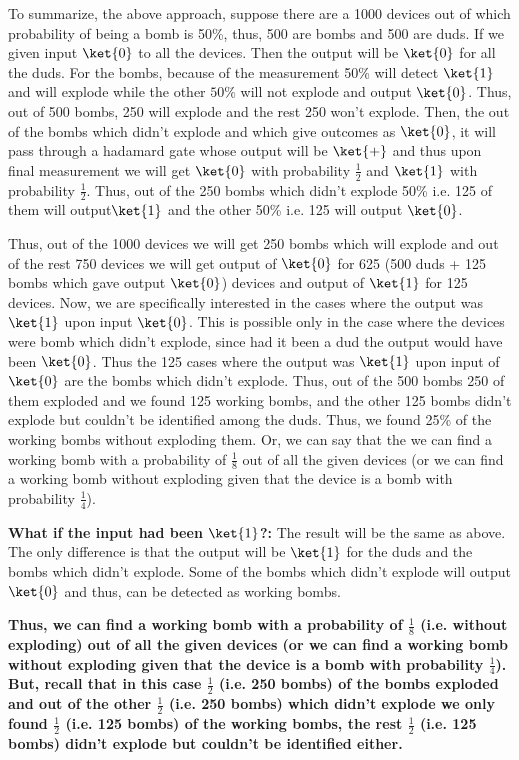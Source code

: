 \documentclass[12pt, oneside]{book}
\theoremstyle{definition}
\theoremstyle{definition}
\theoremstyle{remark}
\begin{document}
    To summarize, the above approach, suppose there are a 1000 devices out of which probability of being a bomb is 50\%, thus, 500 are bombs and 500 are duds. If we given input $\ket{0}$ to all the devices. Then the output will be $\ket{0}$ for all the duds. 
    For the bombs, because of the measurement 50\% will detect $\ket{1}$ and will explode while the other $50\%$ will not explode and output $\ket{0}$. Thus, out of 500 bombs, 250 will explode and the rest 250 won't explode. 
    Then, the out of the bombs which didn't explode and which give outcomes as $\ket{0}$, it will pass through a hadamard gate whose output will be $\ket{+}$ and thus upon final measurement we will get $\ket{0}$ with probability $\frac{1}{2}$ and $\ket{1}$ with probability $\frac{1}{2}$.
    Thus, out of the 250 bombs which didn't explode 50\% i.e. 125 of them will output$\ket{1}$ and the other 50\% i.e. 125 will output $\ket{0}$. 

    Thus, out of the 1000 devices we will get 250 bombs which will explode and out of the rest 750 devices we will get output of $\ket{0}$ for 625 (500 duds + 125 bombs which gave output $\ket{0}$) devices and output of $\ket{1}$ for 125 devices. Now, we are specifically interested in the cases where the output was $\ket{1}$ upon input $\ket{0}$. This is possible
    only in the case where the devices were bomb which didn't explode, since had it been a dud the output would have been $\ket{0}$. Thus the 125 cases where the output was $\ket{1}$ upon input of $\ket{0}$ are the bombs which didn't explode. 
    Thus, out of the 500 bombs 250 of them exploded and we found 125 working bombs, and the other 125 bombs didn't explode but couldn't be identified among the duds. Thus, we found 25\% of the working bombs without exploding them. Or, we can say that the we can find a working bomb with a probability of $\frac{1}{8}$ out of all the given devices (or we can find a working bomb without exploding given that the device is a bomb with probability $\frac{1}{4}$).
    
    \textbf{What if the input had been $\ket{1}$?: }The result will be the same as above. The only difference is that the output will be $\ket{1}$ for the duds and the bombs which didn't explode. Some of the bombs which didn't explode will output $\ket{0}$ and thus, can be detected as working bombs.
    
    \textbf{Thus, we can find a working bomb with a probability of $\frac{1}{8}$ (i.e. without exploding) out of all the given devices (or we can find a working bomb without exploding given that the device is a bomb with probability $\frac{1}{4}$). But, recall that in this case $\frac{1}{2}$ (i.e. 250 bombs) of the bombs exploded and out of the other $\frac{1}{2}$ (i.e. 250 bombs) which didn't explode we only found $\frac{1}{2}$ (i.e. 125 bombs) of the working bombs, the rest $\frac{1}{2}$ (i.e. 125 bombs) didn't explode but couldn't be identified either.}
\end{document}
